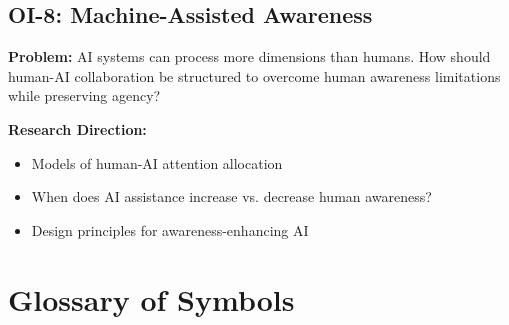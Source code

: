 \subsection{OI-8: Machine-Assisted Awareness}

\textbf{Problem:} AI systems can process more dimensions than humans. How should human-AI collaboration be structured to overcome human awareness limitations while preserving agency?

\textbf{Research Direction:}
\begin{itemize}[nosep]
    \item Models of human-AI attention allocation
    \item When does AI assistance increase vs. decrease human awareness?
    \item Design principles for awareness-enhancing AI
\end{itemize}


\section{Glossary of Symbols}
\label{sec:glossary-symbols}

